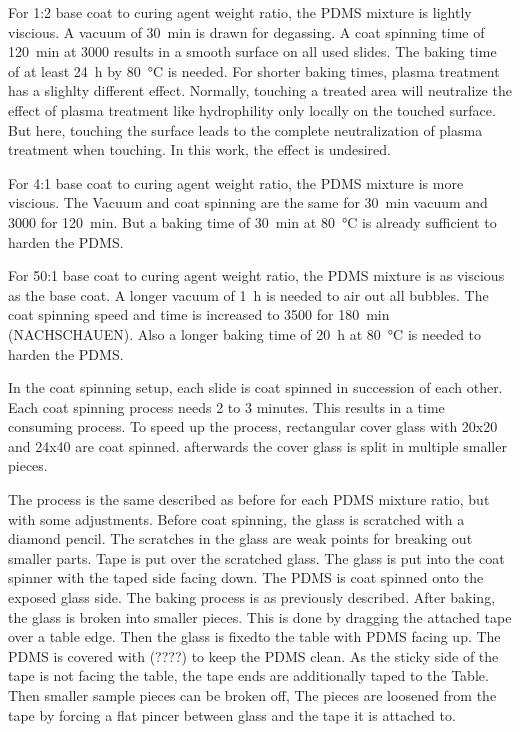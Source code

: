 For 1:2 base coat to curing agent weight ratio, the PDMS mixture is lightly viscious. A vacuum of \SI{30}{\minute} is drawn for degassing. A coat spinning time of \SI{120}{\minute} at \SI{3000}{\rpm} results in a smooth surface on all used slides. The baking time of at least \SI{24}{\hour} by \SI{80}{\degreeCelsius} is needed. For shorter baking times, plasma treatment has a slighlty different effect. Normally, touching a treated area will neutralize the effect of plasma treatment like hydrophility only locally on the touched surface. But here, touching the surface leads to the complete neutralization of plasma treatment when touching. In this work, the effect is undesired.
 
For 4:1 base coat to curing agent weight ratio, the PDMS mixture is more viscious. The Vacuum and coat spinning are the same for \SI{30}{\minute} vacuum and \SI{3000}{\rpm} for \SI{120}{\minute}. But a baking time of \SI{30}{\minute} at \SI{80}{\degreeCelsius} is already sufficient to harden the PDMS. 

For 50:1 base coat to curing agent weight ratio, the PDMS mixture is as viscious as the base coat. A longer vacuum of \SI{1}{\hour} is needed to air out all bubbles. The coat spinning speed and time is increased to \SI{3500}{\rpm} for \SI{180}{\minute} (NACHSCHAUEN). Also a longer baking time of \SI{20}{\hour} at \SI{80}{\degreeCelsius} is needed to harden the PDMS. 

In the coat spinning setup, each slide is coat spinned in succession of each other. Each coat spinning process needs 2 to 3 minutes. This results in a time consuming process. To speed up the process, rectangular cover glass with 20x20 and 24x40 are coat spinned. afterwards the cover glass is split in multiple smaller pieces. 

The process is the same described as before for each PDMS mixture ratio, but with some adjustments. Before coat spinning, the glass is scratched with a diamond pencil. The scratches in the glass are weak points for breaking out smaller parts. Tape is put over the scratched glass. The glass is put into the coat spinner with the taped side facing down. The PDMS is coat spinned onto the exposed glass side. The baking process is as previously described. After baking, the glass is broken into smaller pieces. This is done by dragging the attached tape over a table edge. Then the glass is fixedto the table with PDMS facing up. The PDMS is covered with (????) to keep the PDMS clean. As the sticky side of the tape is not facing the table, the tape ends are additionally taped to the Table. Then smaller sample pieces can be broken off, The pieces are loosened from the tape by forcing a flat pincer between glass and the tape it is attached to.

